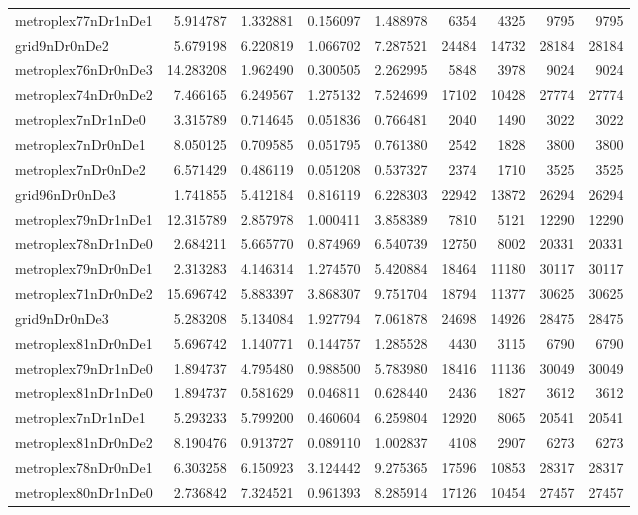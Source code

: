 \begin{longtable}{|l|r|r|r|r|r|r|r|r|}
metroplex77nDr1nDe1 & 5.914787 & 1.332881 & 0.156097 & 1.488978 & 6354 & 4325 & 9795 & 9795 \\
grid9nDr0nDe2 & 5.679198 & 6.220819 & 1.066702 & 7.287521 & 24484 & 14732 & 28184 & 28184 \\
metroplex76nDr0nDe3 & 14.283208 & 1.962490 & 0.300505 & 2.262995 & 5848 & 3978 & 9024 & 9024 \\
metroplex74nDr0nDe2 & 7.466165 & 6.249567 & 1.275132 & 7.524699 & 17102 & 10428 & 27774 & 27774 \\
metroplex7nDr1nDe0 & 3.315789 & 0.714645 & 0.051836 & 0.766481 & 2040 & 1490 & 3022 & 3022 \\
metroplex7nDr0nDe1 & 8.050125 & 0.709585 & 0.051795 & 0.761380 & 2542 & 1828 & 3800 & 3800 \\
metroplex7nDr0nDe2 & 6.571429 & 0.486119 & 0.051208 & 0.537327 & 2374 & 1710 & 3525 & 3525 \\
grid96nDr0nDe3 & 1.741855 & 5.412184 & 0.816119 & 6.228303 & 22942 & 13872 & 26294 & 26294 \\
metroplex79nDr1nDe1 & 12.315789 & 2.857978 & 1.000411 & 3.858389 & 7810 & 5121 & 12290 & 12290 \\
metroplex78nDr1nDe0 & 2.684211 & 5.665770 & 0.874969 & 6.540739 & 12750 & 8002 & 20331 & 20331 \\
metroplex79nDr0nDe1 & 2.313283 & 4.146314 & 1.274570 & 5.420884 & 18464 & 11180 & 30117 & 30117 \\
metroplex71nDr0nDe2 & 15.696742 & 5.883397 & 3.868307 & 9.751704 & 18794 & 11377 & 30625 & 30625 \\
grid9nDr0nDe3 & 5.283208 & 5.134084 & 1.927794 & 7.061878 & 24698 & 14926 & 28475 & 28475 \\
metroplex81nDr0nDe1 & 5.696742 & 1.140771 & 0.144757 & 1.285528 & 4430 & 3115 & 6790 & 6790 \\
metroplex79nDr1nDe0 & 1.894737 & 4.795480 & 0.988500 & 5.783980 & 18416 & 11136 & 30049 & 30049 \\
metroplex81nDr1nDe0 & 1.894737 & 0.581629 & 0.046811 & 0.628440 & 2436 & 1827 & 3612 & 3612 \\
metroplex7nDr1nDe1 & 5.293233 & 5.799200 & 0.460604 & 6.259804 & 12920 & 8065 & 20541 & 20541 \\
metroplex81nDr0nDe2 & 8.190476 & 0.913727 & 0.089110 & 1.002837 & 4108 & 2907 & 6273 & 6273 \\
metroplex78nDr0nDe1 & 6.303258 & 6.150923 & 3.124442 & 9.275365 & 17596 & 10853 & 28317 & 28317 \\
metroplex80nDr1nDe0 & 2.736842 & 7.324521 & 0.961393 & 8.285914 & 17126 & 10454 & 27457 & 27457 \\

\end{longtable}
